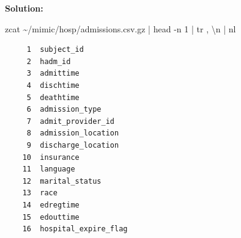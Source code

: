 \documentclass[
]{article}
\newenvironment{Shaded}{\begin{snugshade}}{\end{snugshade}}
\newcommand{\AttributeTok}[1]{\textcolor[rgb]{0.40,0.45,0.13}{#1}}
\newcommand{\FunctionTok}[1]{\textcolor[rgb]{0.28,0.35,0.67}{#1}}
\newcommand{\KeywordTok}[1]{\textcolor[rgb]{0.00,0.23,0.31}{#1}}
\newcommand{\NormalTok}[1]{\textcolor[rgb]{0.00,0.23,0.31}{#1}}
\newcommand{\StringTok}[1]{\textcolor[rgb]{0.13,0.47,0.30}{#1}}
\begin{document}
\textbf{Solution:}

\begin{Shaded}
\begin{Highlighting}[]
\FunctionTok{zcat}\NormalTok{ \textasciitilde{}/mimic/hosp/admissions.csv.gz }\KeywordTok{|} \FunctionTok{head} \AttributeTok{{-}n}\NormalTok{ 1 }\KeywordTok{|} \FunctionTok{tr} \StringTok{\textquotesingle{},\textquotesingle{}} \StringTok{\textquotesingle{}\textbackslash{}n\textquotesingle{}} \KeywordTok{|} \FunctionTok{nl}
\end{Highlighting}
\end{Shaded}

\begin{verbatim}
     1  subject_id
     2  hadm_id
     3  admittime
     4  dischtime
     5  deathtime
     6  admission_type
     7  admit_provider_id
     8  admission_location
     9  discharge_location
    10  insurance
    11  language
    12  marital_status
    13  race
    14  edregtime
    15  edouttime
    16  hospital_expire_flag
\end{verbatim}
\end{document}
